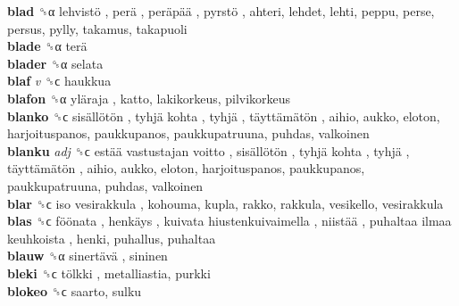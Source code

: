 \textbf{blad} ␝α   lehvistö ,  perä ,  peräpää ,  pyrstö , ahteri, lehdet, lehti, peppu, perse, persus, pylly, takamus, takapuoli  \\
\textbf{blade} ␝α   terä   \\
\textbf{blader} ␝α  selata  \\
\textbf{blaf} \emph{v}  ␝ϲ  haukkua  \\
\textbf{blafon} ␝α   yläraja , katto, lakikorkeus, pilvikorkeus  \\
\textbf{blanko} ␝ϲ   sisällötön ,  tyhjä kohta ,  tyhjä ,  täyttämätön , aihio, aukko, eloton, harjoituspanos, paukkupanos, paukkupatruuna, puhdas, valkoinen  \\
\textbf{blanku} \emph{adj}  ␝ϲ   estää vastustajan voitto ,  sisällötön ,  tyhjä kohta ,  tyhjä ,  täyttämätön , aihio, aukko, eloton, harjoituspanos, paukkupanos, paukkupatruuna, puhdas, valkoinen  \\
\textbf{blar} ␝ϲ   iso vesirakkula , kohouma, kupla, rakko, rakkula, vesikello, vesirakkula  \\
\textbf{blas} ␝ϲ   föönata ,  henkäys ,  kuivata hiustenkuivaimella ,  niistää ,  puhaltaa ilmaa keuhkoista , henki, puhallus, puhaltaa  \\
\textbf{blauw} ␝α   sinertävä , sininen  \\
\textbf{bleki} ␝ϲ   tölkki , metalliastia, purkki  \\
\textbf{blokeo} ␝ϲ  saarto, sulku  \\

